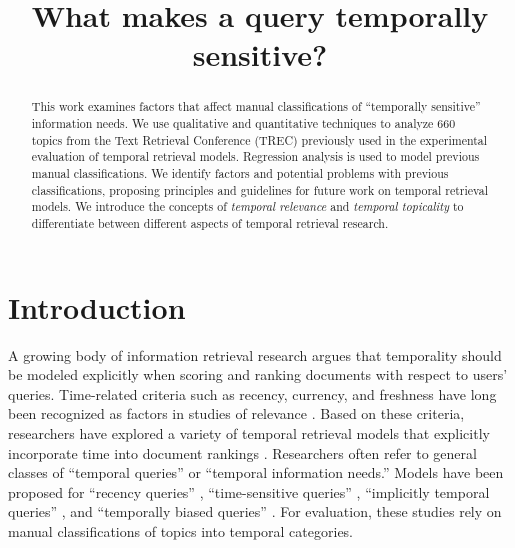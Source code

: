 \documentclass{sig-alternate}
\begin{document}
\author{}


\title{What makes a query temporally sensitive?}

\maketitle


\begin{abstract}

This work examines factors that affect manual classifications of ``temporally sensitive'' information needs. We use qualitative and quantitative techniques to analyze 660 topics from the Text Retrieval Conference (TREC) previously used in the experimental evaluation of temporal retrieval models.  Regression analysis is used to model previous manual classifications. We identify factors and potential problems with previous classifications, proposing principles and guidelines for future work on temporal retrieval models.  We introduce the concepts of \emph{temporal relevance} and \emph{temporal topicality} to differentiate between different aspects of temporal retrieval research.

\end{abstract}


\section{Introduction}

A growing body of information retrieval research argues that temporality should be modeled explicitly when scoring and ranking documents with respect to users' queries. Time-related criteria such as recency, currency, and freshness have long been recognized as factors in studies of relevance \cite{Barry1998, Dai2010, Dong2010}. Based on these criteria, researchers have explored a variety of temporal retrieval models that explicitly incorporate time into document rankings \cite{Li2003,Efron2011,Dakka2012,Kanhabua2011,Kanhabua2012a,Peetz2013a}. Researchers often refer to general classes of ``temporal queries'' or ``temporal information needs.''  Models have been proposed for ``recency queries'' \cite{Li2003,Efron2011}, ``time-sensitive queries'' \cite{Dakka2012}, ``implicitly temporal queries'' \cite{Metzler2009}, and ``temporally biased queries'' \cite{Jones2007}.  For evaluation,  these studies rely on manual classifications of topics into temporal categories.
\end{document}
